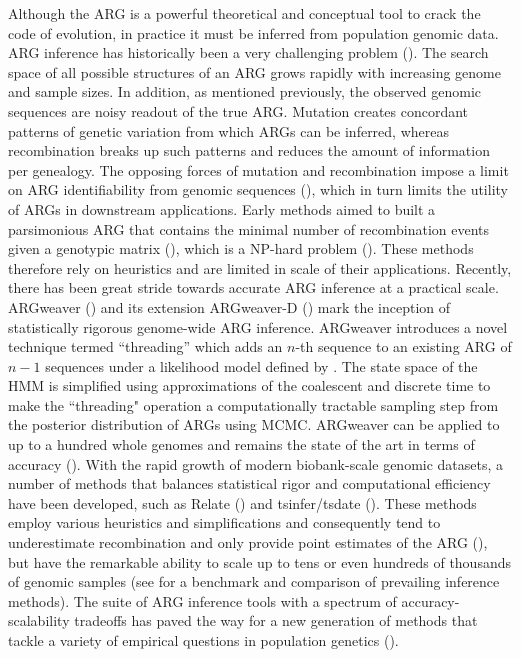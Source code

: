 Although the \ac{ARG} is a powerful theoretical and conceptual tool to crack the code of evolution, in practice it must be inferred from population genomic data. \ac{ARG} inference has historically been a very challenging problem (\cite{rasmussen_genome-wide_2014,mathieson_what_2020}). The search space of all possible structures of an \ac{ARG} grows rapidly with increasing genome and sample sizes. In addition, as mentioned previously, the observed genomic sequences are noisy readout of the true \ac{ARG}. Mutation creates concordant patterns of genetic variation from which \acp{ARG} can be inferred, whereas recombination breaks up such patterns and reduces the amount of information per genealogy. The opposing forces of mutation and recombination impose a limit on \ac{ARG} identifiability from genomic sequences (\cite{hubisz2020inference,hayman2023recoverability}), which in turn limits the utility of \acp{ARG} in downstream applications. Early methods aimed to built a parsimonious \ac{ARG} that contains the minimal number of recombination events given a genotypic matrix (\cite{wong2023general}), which is a NP-hard problem (\cite{wang2001perfect}). These methods therefore rely on heuristics and are limited in scale of their applications. Recently, there has been great stride towards accurate \ac{ARG} inference at a practical scale. ARGweaver (\cite{rasmussen_genome-wide_2014}) and its extension ARGweaver-D (\cite{hubisz_mapping_2020}) mark the inception of statistically rigorous genome-wide \ac{ARG} inference. ARGweaver introduces a novel technique termed “threading” which adds an $n$-th sequence to an existing \ac{ARG} of $n-1$ sequences under a likelihood model defined by . The state space of the \ac{HMM} is simplified using approximations of the coalescent and discrete time to make the ``threading" operation a computationally tractable sampling step from the posterior distribution of \acp{ARG} using \ac{MCMC}. ARGweaver can be applied to up to a hundred whole genomes and remains the state of the art in terms of accuracy (\cite{brandt2022evaluation}). With the rapid growth of modern biobank-scale genomic datasets, a number of methods that balances statistical rigor and computational efficiency have been developed, such as Relate (\cite{speidel_method_2019}) and tsinfer/tsdate (\cite{kelleher_inferring_2019,wohns_unified_nodate}). These methods employ various heuristics and simplifications and consequently tend to underestimate recombination and only provide point estimates of the \ac{ARG} (\cite{lewanski2023era,wong2023general}), but have the remarkable ability to scale up to tens or even hundreds of thousands of genomic samples (see \cite{brandt2022evaluation} for a benchmark and comparison of prevailing inference methods). The suite of \ac{ARG} inference tools with a spectrum of accuracy-scalability tradeoffs has paved the way for a new generation of methods that tackle a variety of empirical questions in population genetics (\cite{stern_approximate_2019,stern_disentangling_2021,speidel_method_2019}).

